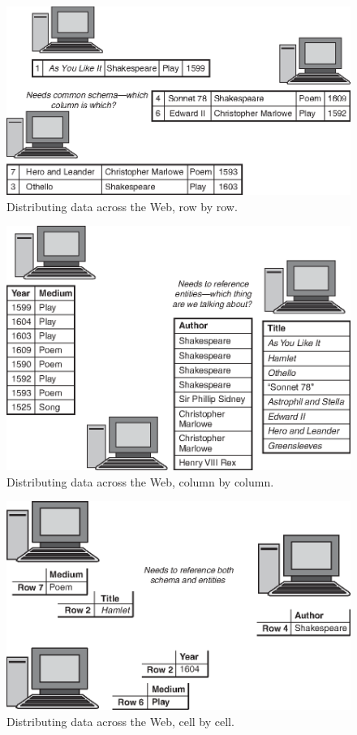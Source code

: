 \begin{figure}
    \centering
    \includegraphics[width=5.0in]{media/ch3/f03-01-9780123859655.eps}
    \caption{Distributing data across the Web, row by row.}
    \label{fig:ch3.1}
\end{figure}



\begin{figure}
    \centering
    \includegraphics[width=5.0in]{media/ch3/f03-02-9780123859655.eps}
    \caption{Distributing data across the Web, column by column.}
    \label{fig:ch3.2}
\end{figure}



\begin{figure}
    \centering
    \includegraphics[width=5.0in]{media/ch3/f03-03-9780123859655.eps}
    \caption{Distributing data across the Web, cell by cell.}
    \label{fig:ch3.3}
\end{figure}



